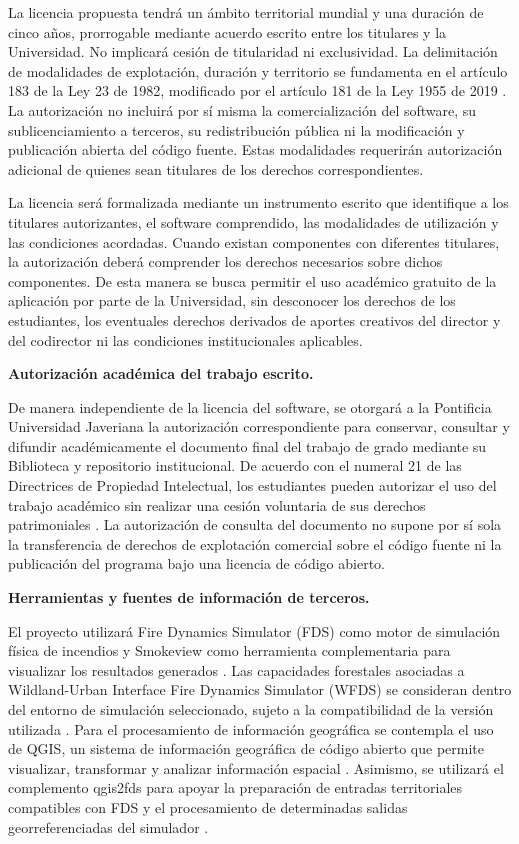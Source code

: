 La licencia propuesta tendrá un ámbito territorial mundial y una duración de cinco años, prorrogable mediante acuerdo escrito entre los titulares y la Universidad. No implicará cesión de titularidad ni exclusividad. La delimitación de modalidades de explotación, duración y territorio se fundamenta en el artículo 183 de la Ley 23 de 1982, modificado por el artículo 181 de la Ley 1955 de 2019 \cite{vfpLey1955Art181}. La autorización no incluirá por sí misma la comercialización del software, su sublicenciamiento a terceros, su redistribución pública ni la modificación y publicación abierta del código fuente. Estas modalidades requerirán autorización adicional de quienes sean titulares de los derechos correspondientes.

La licencia será formalizada mediante un instrumento escrito que identifique a los titulares autorizantes, el software comprendido, las modalidades de utilización y las condiciones acordadas. Cuando existan componentes con diferentes titulares, la autorización deberá comprender los derechos necesarios sobre dichos componentes. De esta manera se busca permitir el uso académico gratuito de la aplicación por parte de la Universidad, sin desconocer los derechos de los estudiantes, los eventuales derechos derivados de aportes creativos del director y del codirector ni las condiciones institucionales aplicables.

\textbf{Autorización académica del trabajo escrito.}

De manera independiente de la licencia del software, se otorgará a la Pontificia Universidad Javeriana la autorización correspondiente para conservar, consultar y difundir académicamente el documento final del trabajo de grado mediante su Biblioteca y repositorio institucional. De acuerdo con el numeral 21 de las Directrices de Propiedad Intelectual, los estudiantes pueden autorizar el uso del trabajo académico sin realizar una cesión voluntaria de sus derechos patrimoniales \cite{vfpJaverianaDirectrices2018}. La autorización de consulta del documento no supone por sí sola la transferencia de derechos de explotación comercial sobre el código fuente ni la publicación del programa bajo una licencia de código abierto.

\textbf{Herramientas y fuentes de información de terceros.}

El proyecto utilizará Fire Dynamics Simulator (FDS) como motor de simulación física de incendios y Smokeview como herramienta complementaria para visualizar los resultados generados \cite{fdsnist}. Las capacidades forestales asociadas a Wildland-Urban Interface Fire Dynamics Simulator (WFDS) se consideran dentro del entorno de simulación seleccionado, sujeto a la compatibilidad de la versión utilizada \cite{wfdsusfs}. Para el procesamiento de información geográfica se contempla el uso de QGIS, un sistema de información geográfica de código abierto que permite visualizar, transformar y analizar información espacial \cite{vfpQGIS}. Asimismo, se utilizará el complemento qgis2fds para apoyar la preparación de entradas territoriales compatibles con FDS y el procesamiento de determinadas salidas georreferenciadas del simulador \cite{vfpQGIS2FDS}.

